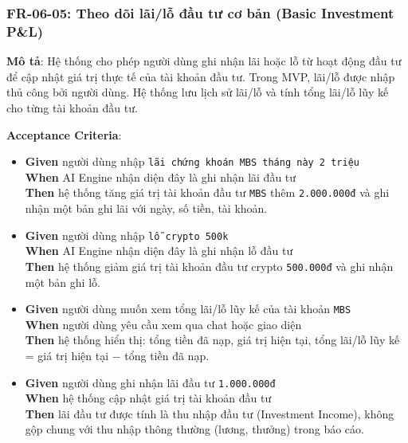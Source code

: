 \subsubsection{FR-06-05: Theo dõi lãi/lỗ đầu tư cơ bản (Basic Investment P\&L)}

\textbf{Mô tả}: Hệ thống cho phép người dùng ghi nhận lãi hoặc lỗ từ hoạt động đầu tư để cập nhật giá trị thực tế của tài khoản đầu tư. Trong MVP, lãi/lỗ được nhập thủ công bởi người dùng. Hệ thống lưu lịch sử lãi/lỗ và tính tổng lãi/lỗ lũy kế cho từng tài khoản đầu tư.



\textbf{Acceptance Criteria}:

\begin{itemize}
\item \textbf{Given} người dùng nhập \texttt{lãi chứng khoán MBS tháng này 2 triệu}  \\ \hspace*{1.5em}  \textbf{When} AI Engine nhận diện đây là ghi nhận lãi đầu tư  \\ \hspace*{1.5em}  \textbf{Then} hệ thống tăng giá trị tài khoản đầu tư \texttt{MBS} thêm \texttt{2.000.000đ} và ghi nhận một bản ghi lãi với ngày, số tiền, tài khoản.
\item \textbf{Given} người dùng nhập \texttt{lỗ crypto 500k}  \\ \hspace*{1.5em}  \textbf{When} AI Engine nhận diện đây là ghi nhận lỗ đầu tư  \\ \hspace*{1.5em}  \textbf{Then} hệ thống giảm giá trị tài khoản đầu tư crypto \texttt{500.000đ} và ghi nhận một bản ghi lỗ.
\item \textbf{Given} người dùng muốn xem tổng lãi/lỗ lũy kế của tài khoản \texttt{MBS}  \\ \hspace*{1.5em}  \textbf{When} người dùng yêu cầu xem qua chat hoặc giao diện  \\ \hspace*{1.5em}  \textbf{Then} hệ thống hiển thị: tổng tiền đã nạp, giá trị hiện tại, tổng lãi/lỗ lũy kế = giá trị hiện tại − tổng tiền đã nạp.
\item \textbf{Given} người dùng ghi nhận lãi đầu tư \texttt{1.000.000đ}  \\ \hspace*{1.5em}  \textbf{When} hệ thống cập nhật giá trị tài khoản đầu tư  \\ \hspace*{1.5em}  \textbf{Then} lãi đầu tư được tính là thu nhập đầu tư (Investment Income), không gộp chung với thu nhập thông thường (lương, thưởng) trong báo cáo.

\end{itemize}
